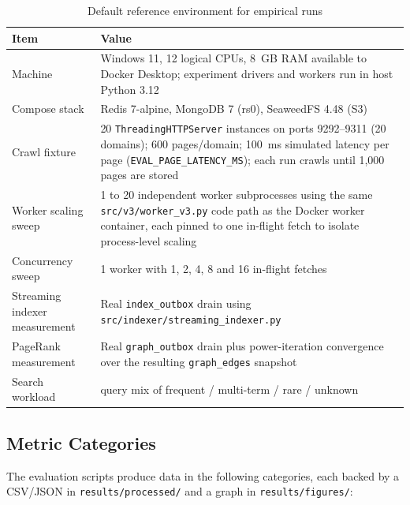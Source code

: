 \documentclass[11pt,a4paper]{article}
\newcommand{\code}[1]{\texttt{#1}}
\begin{document}
\begin{table}[H]
\centering
\caption{Default reference environment for empirical runs}
\begin{tabular}{p{}p{}}
\toprule
Item & Value \\
\midrule
Machine & Windows 11, 12 logical CPUs, 8~GB RAM available to Docker Desktop; experiment drivers and workers run in host Python 3.12\\
Compose stack & Redis 7-alpine, MongoDB 7 (rs0), SeaweedFS 4.48 (S3)\\
Crawl fixture & 20 \code{ThreadingHTTPServer} instances on ports 9292--9311 (20 domains); 600 pages/domain; 100~ms simulated latency per page (\code{EVAL\_PAGE\_LATENCY\_MS}); each run crawls until 1{,}000 pages are stored\\
Worker scaling sweep & 1 to 20 independent worker subprocesses using the same \code{src/v3/worker\_v3.py} code path as the Docker worker container, each pinned to one in-flight fetch to isolate process-level scaling\\
Concurrency sweep & 1 worker with 1, 2, 4, 8 and 16 in-flight fetches\\
Streaming indexer measurement & Real \code{index\_outbox} drain using \code{src/indexer/streaming\_indexer.py}\\
PageRank measurement & Real \code{graph\_outbox} drain plus power-iteration convergence over the resulting \code{graph\_edges} snapshot\\
Search workload & query mix of frequent / multi-term / rare / unknown\\
\bottomrule
\end{tabular}
\end{table}

\subsection{Metric Categories}

The evaluation scripts produce data in the following categories, each backed by a CSV/JSON in \code{results/processed/} and a graph in \code{results/figures/}:
\end{document}
